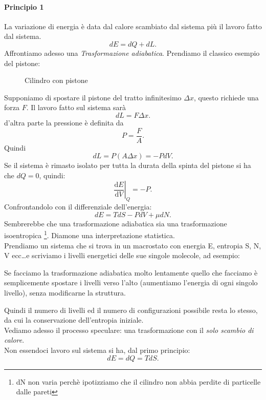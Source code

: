 \paragraph{Principio 1}%
La variazione di energia è data dal calore scambiato dal sistema più il lavoro fatto dal sistema.
\[
	dE = dQ + dL
.\] 
Affrontiamo adesso una \textit{Trasformazione adiabatica}.
Prendiamo il classico esempio del pistone:
\begin{figure}[H]
    \centering
    \caption{Cilindro con pistone}
    \label{fig:cilindro-con-pistone}
\end{figure}
\noindent Supponiamo di spostare il pistone del tratto infinitesimo $\Delta x$, questo richiede una forza $F$. Il lavoro fatto sul sistema sarà 
 \[
	dL = F \Delta x
.\] 
d'altra parte la pressione è definita da
\[
	P = \frac{F}{A}
.\] 
Quindi 
\[
	dL = P\left( A \Delta x \right) = -PdV
.\] 
Se il sistema è rimasto isolato per tutta la durata della spinta del pistone si ha che $dQ=0$, quindi:
\[
	\left.\frac{\mbox{d} E}{\mbox{d} V}\right|_{Q} = -P
.\] 
Confrontandolo con il differenziale dell'energia:
\[
	dE = TdS - P dV + \mu dN
.\] 
Sembrerebbe che una trasformazione adiabatica sia una trasformazione isoentropica \footnote{dN non varia perchè ipotizziamo che il cilindro non abbia perdite di particelle dalle pareti}. Diamone una interpretazione statistica.\\
Prendiamo un sistema che si trova in un macrostato con energia E, entropia S, N, V ecc\ldots e scriviamo i livelli energetici delle sue singole molecole, ad esempio:
\begin{figure}[H]
    \centering
    \label{fig:distribuzione-livelli-molecole}
\end{figure}
\noindent
Se facciamo la trasformazione adiabatica molto lentamente quello che facciamo è semplicemente spostare i livelli verso l'alto (aumentiamo l'energia di ogni singolo livello), senza modificarne la struttura.
\begin{figure}[H]
    \centering
    \label{fig:livelli-energetici-alzati}
\end{figure}
\noindent
Quindi il numero di livelli ed il numero di configurazioni possibile resta lo stesso, da cui la conservazione dell'entropia iniziale.\\
Vediamo adesso il processo speculare: una trasformazione con il \textit{solo scambio di calore}. \\
Non essendoci lavoro sul sistema si ha, dal primo principio:
\[
	dE = dQ = TdS
.\] 
